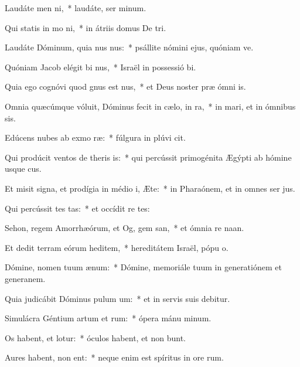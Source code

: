 \item Laudáte men ni,~* laudáte, ser minum.
\item Qui statis in mo ni,~* in átriis domus De tri.
\item Laudáte Dóminum, quia nus nus:~* psállite nómini ejus, quóniam ve.
\item Quóniam Jacob elégit bi nus,~* Israël in possessió bi.
\item Quia ego cognóvi quod gnus est nus,~* et Deus noster præ ómni is.
\item Omnia quæcúmque vóluit, Dóminus fecit in cælo,  in ra,~* in mari, et in ómnibus sis.
\item Edúcens nubes ab exmo ræ:~* fúlgura in plúvi cit.
\item Qui prodúcit ventos de theris is:~* qui percússit primogénita Ægýpti ab hómine usque  cus.
\item Et misit signa, et prodígia in médio i, Æte:~* in Pharaónem, et in omnes ser jus.
\item Qui percússit tes tas:~* et occídit re tes:
\item Sehon, regem Amorrhæórum, et Og, gem san,~* et ómnia re naan.
\item Et dedit terram eórum heditem,~* hereditátem Israël, pópu o.
\item Dómine, nomen tuum  ænum:~* Dómine, memoriále tuum in generatiónem et generanem.
\item Quia judicábit Dóminus pulum um:~* et in servis suis debitur.
\item Simulácra Géntium artum et rum:~* ópera mánu minum.
\item Os habent, et  lotur:~* óculos habent, et non bunt.
\item Aures habent,  non ent:~* neque enim est spíritus in ore rum.
